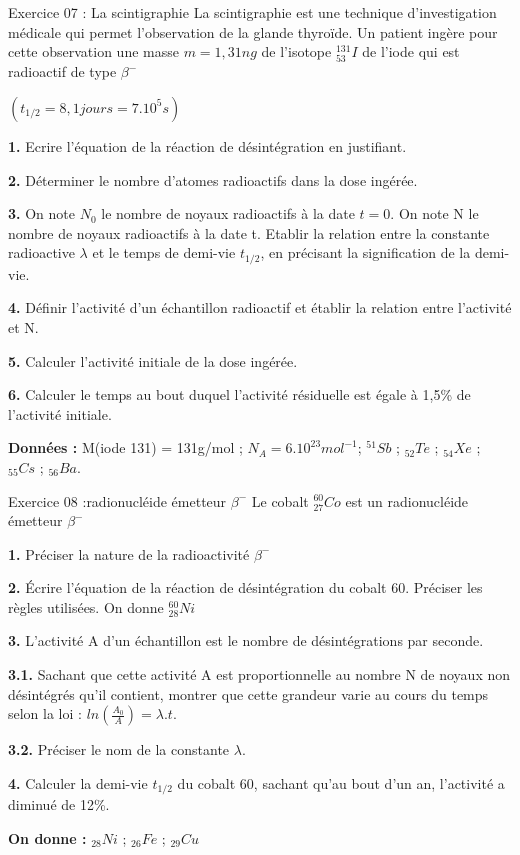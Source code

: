 \documentclass[12pt, french]{article}
\begin{document}
\begin{Box2}{Exercice 07 : La scintigraphie }
La scintigraphie est une technique d’investigation médicale qui permet l'observation de la glande
thyroïde. Un patient ingère pour cette observation une masse $m=1,31ng$ de l'isotope $^{131}_{53}I$ de l'iode qui
est radioactif de type $\beta^-$ 

$(t_{1/2}= 8,1 jours = 7.10^5s)$

\textbf{1. } Ecrire l'équation de la réaction de désintégration en justifiant.

\textbf{2. } Déterminer le nombre d'atomes radioactifs dans la dose ingérée.

\textbf{3. } On note $N_0$ le nombre de noyaux radioactifs à la date $t=0$. On note N le nombre de noyaux
radioactifs à la date t. Etablir la relation entre la constante radioactive $\lambda$ et le temps de demi-vie $t_{1/2}$, en précisant la signification de la demi-vie.

\textbf{4. } Définir l'activité d'un échantillon radioactif et établir la relation entre l'activité et N.

\textbf{5. } Calculer l'activité initiale de la dose ingérée.

\textbf{6. } Calculer le temps au bout duquel l'activité résiduelle est égale à 1,5\% de l'activité initiale.

\textbf{Données : } M(iode 131) = 131g/mol ; $N_A= 6.10^{23}mol^{-1}$; $^{51}Sb$ ; $_{52}Te$ ; $_{54}Xe$ ; $_{55}Cs$ ; $_{56}Ba$.
\end{Box2}

\begin{Box2}{Exercice 08 :radionucléide émetteur $\beta^-$
 }
Le cobalt $^{60}_{27}Co$ est un radionucléide émetteur $\beta^-$

\textbf{1. } Préciser la nature de la radioactivité $\beta^-$

\textbf{2. } Écrire l’équation de la réaction de désintégration du cobalt 60. Préciser les règles utilisées. On
donne $^{60}_{28}Ni$

\textbf{3. } L’activité A d’un échantillon est le nombre de désintégrations par seconde.

\textbf{3.1. } Sachant que cette activité A est proportionnelle au nombre N de noyaux non désintégrés qu’il contient, montrer que cette grandeur varie au cours du temps selon la loi : $ln(\frac{A_0}{A})=\lambda.t$.

\textbf{3.2. } Préciser le nom de la constante $\lambda$.

\textbf{4.} Calculer la demi-vie $t_{1/2}$ du cobalt 60, sachant qu'au bout d'un an, l'activité a diminué de 12\%.

\textbf{On donne : } $_{28}Ni$ ; $_{26}Fe$ ; $_{29}Cu$
\end{Box2}
\end{document}
